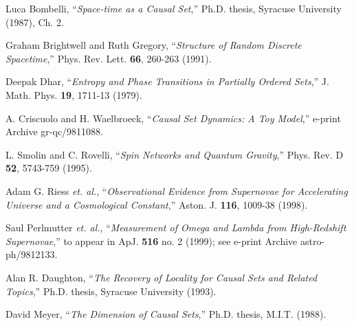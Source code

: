 \documentclass[aps,amssymb,12pt]{revtex4-2}
\begin{document}
\begin{references}
  Luca Bombelli, ``{\it Space-time as a Causal Set},'' Ph.D.
thesis, Syracuse University (1987), Ch. 2.

  Graham Brightwell and Ruth Gregory, ``{\it Structure of Random
Discrete Spacetime},'' Phys. Rev. Lett. {\bf 66}, 260-263 (1991).

  Deepak Dhar, ``{\it Entropy and Phase Transitions in Partially
Ordered Sets},'' J. Math. Phys. {\bf 19}, 1711-13 (1979).

  A. Criscuolo and H. Waelbroeck, ``{\it Causal Set Dynamics: A
Toy Model},'' e-print Archive gr-qc/9811088.

  L. Smolin and C. Rovelli, ``{\it Spin Networks and Quantum
Gravity},'' Phys. Rev. D {\bf 52}, 5743-759 (1995).

  Adam G. Riess {\it et. al.}, ``{\it Observational Evidence
from Supernovae for Accelerating Universe and a Cosmological Constant},''
Aston. J. {\bf 116}, 1009-38 (1998).

  Saul Perlmutter {\it et. al.}, ``{\it Measurement of Omega and
Lambda from High-Redshift Supernovae},'' to appear in ApJ. {\bf 516} no. 2
(1999); see e-print Archive astro-ph/9812133.

  Alan R. Daughton, ``{\it The Recovery of Locality for Causal
Sets and Related Topics},'' Ph.D. thesis, Syracuse University (1993).

  David Meyer, ``{\it The Dimension of Causal Sets},'' Ph.D.
thesis, M.I.T. (1988).
\end{references}
\end{document}
